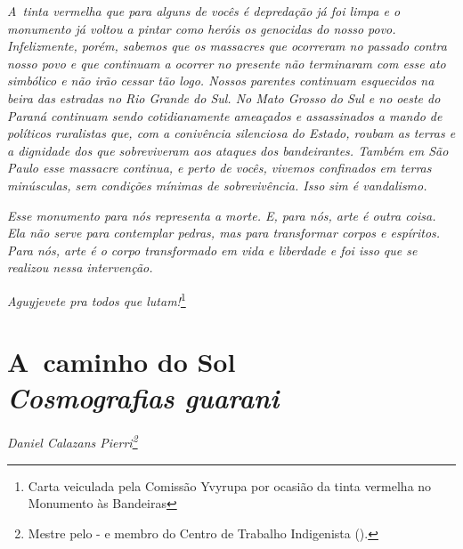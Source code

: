 \begin{samepage}
\emph{A~tinta vermelha que para alguns de vocês é depredação já foi limpa e o
monumento já voltou a pintar como heróis os genocidas do nosso povo.
Infelizmente, porém, sabemos que os massacres que ocorreram no passado
contra nosso povo e que continuam a ocorrer no presente não terminaram
com esse ato simbólico e não irão cessar tão logo. Nossos parentes
continuam esquecidos na beira das estradas no Rio Grande do Sul. No
Mato Grosso do Sul e no oeste do Paraná continuam sendo cotidianamente
ameaçados e assassinados a mando de políticos ruralistas que, com
a conivência silenciosa do Estado, roubam as terras e a dignidade dos
que sobreviveram aos ataques dos bandeirantes. Também em São Paulo esse
massacre continua, e perto de vocês, vivemos confinados em terras
minúsculas, sem condições mínimas de sobrevivência. Isso sim é
vandalismo.}

\emph{Esse monumento para nós representa a morte. E,
para nós, arte é outra coisa. Ela não serve para contemplar pedras,
mas para transformar corpos e espíritos. Para nós, arte é o corpo
transformado em vida e liberdade e foi isso que se realizou nessa
intervenção.}

\emph{Aguyjevete pra todos que lutam!}\footnote[*]{Carta veiculada pela Comissão Yvyrupa por ocasião da tinta
vermelha no Monumento às Bandeiras}
\end{samepage}


\chapter*{A~caminho do Sol\\
\large{\emph{Cosmografias guarani}}}


\begin{flushright}
\emph{Daniel Calazans Pierri\footnote{Mestre pelo - e membro do
Centro de Trabalho Indigenista ().}}
\end{flushright}
\bigskip

